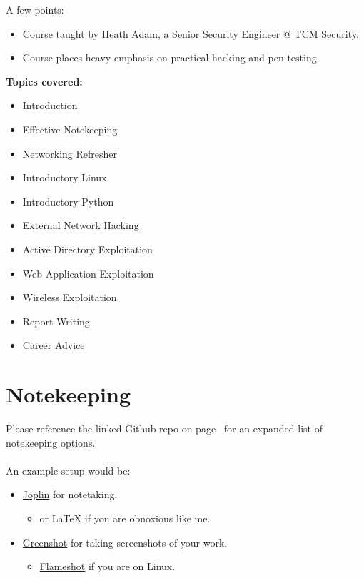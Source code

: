 \documentclass[a4paper,11pt]{article}
\renewcommand{\textbf}{\bf}
\begin{document}
A few points:
\begin{itemize}
    \item Course taught by Heath Adam, a Senior Security Engineer @ TCM Security.
    \item Course places heavy emphasis on practical hacking and pen-testing.
\end{itemize}
\begin{center}
    \textbf{Topics covered:}
\end{center}
\begin{multicols}{2}
\begin{itemize}
    \item Introduction
    \item Effective Notekeeping
    \item Networking Refresher
    \item Introductory Linux
    \item Introductory Python
    \item External Network Hacking
    \item Active Directory Exploitation
    \item Web Application Exploitation
    \item Wireless Exploitation
    \item Report Writing
    \item Career Advice
\end{itemize}
\end{multicols}


\section{Notekeeping}

Please reference the linked Github repo on page~\pageref{resources} for an expanded list of notekeeping options.
\\
\\
An example setup would be:
\begin{itemize}
    \item \href{https://joplinapp.org/}{Joplin} for notetaking.
    \begin{itemize}
        \item or {\LaTeX} if you are obnoxious like me.
    \end{itemize}
    \item \href{https://getgreenshot.org/}{Greenshot} for taking screenshots of your work.
    \begin{itemize}
        \item \href{https://flameshot.js.org/#/}{Flameshot} if you are on Linux.
    \end{itemize}
\end{itemize}
\end{document}

